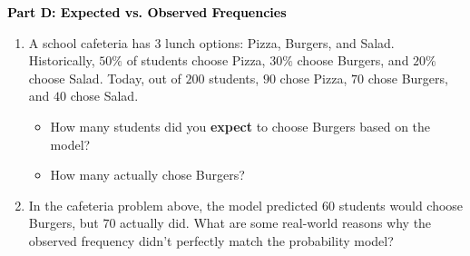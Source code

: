 \documentclass[12pt, letterpaper, fleqn]{article}
\newcommand{\blank}{\underline{\hspace{2.2cm}}}
\begin{document}
\begin{tcolorbox}[colback=customteal!20]
\large\textcolor{black}{\textbf{Part D: Expected vs. Observed Frequencies}}
\end{tcolorbox}

\vspace{3mm}

\begin{enumerate}[itemsep=4.2cm, leftmargin=0.6cm, resume]
\item A school cafeteria has $3$ lunch options: Pizza, Burgers, and Salad. Historically, $50\%$ of students choose Pizza, $30\%$ choose Burgers, and $20\%$ choose Salad. Today, out of $200$ students, $90$ chose Pizza, $70$ chose Burgers, and $40$ chose Salad. 
\begin{itemize}
\item How many students did you \textbf{expect} to choose Burgers based on the model? \blank
\item How many actually chose Burgers? \blank
\end{itemize}
\item In the cafeteria problem above, the model predicted $60$ students would choose Burgers, but $70$ actually did. What are some real-world reasons why the observed frequency didn't perfectly match the probability model?
\end{enumerate}
\end{document}

